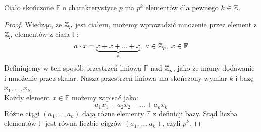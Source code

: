 

\begin{theorem}
	Ciało skończone \( \mathbb{F} \)  o charakterystyce \( p \) ma \( p^k \) elementów dla pewnego \( k \in \mathbb{Z} \).
\end{theorem}
\begin{proof}
	Wiedząc, że \( \mathbb{Z}_p \) jest ciałem, możemy wprowadzić mnożenie przez element z \( \mathbb{Z}_p \) elementów z ciała \( \mathbb{F} \):
	\[
		a \cdot x = \underbrace{x + x + ... + x}_a, \ a \in \mathbb{Z}_p,\; x \in \mathbb{F}
	\]
	Definiujemy w ten sposób przestrzeń liniową \( \mathbb{F} \) nad \( \mathbb{Z}_p \), jako że mamy dodawanie i mnożenie przez skalar. Nasza przestrzeń liniowa ma skończony wymiar \( k \) i bazę \( x_1, \dots, x_k \). \\
	Każdy element \( x \in \mathbb{F} \) możemy zapisać jako:
	\[
		a_1x_1 + a_2x_2 + \dots + a_kx_k
	\]
	Różne ciągi \( (a_1, \dots, a_k) \) dają różne elementy \( \mathbb{F} \) z definicji bazy. Stąd liczba elementów \( \mathbb{F} \) jest równa liczbie ciągów \( (a_1, \dots, a_k) \), czyli \( p^k \).
\end{proof}